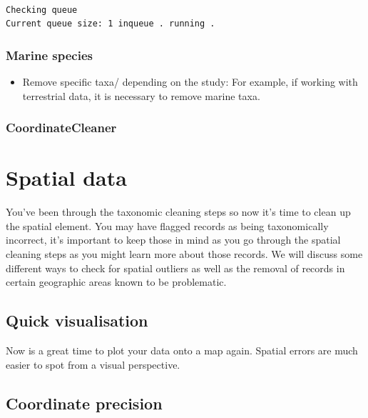 \documentclass[
  letterpaper,
  DIV=11,
  numbers=noendperiod,
  oneside]{scrreprt}
\providecommand{\tightlist}{%
  \setlength{\itemsep}{0pt}\setlength{\parskip}{0pt}}\usepackage{longtable,booktabs,array}
\begin{document}
\begin{verbatim}

Checking queue
Current queue size: 1 inqueue . running .
\end{verbatim}

\hypertarget{marine-species}{%
\subsection{Marine species}\label{marine-species}}

\begin{itemize}
\tightlist
\item
  Remove specific taxa/ depending on the study: For example, if working
  with terrestrial data, it is necessary to remove marine taxa.
\end{itemize}

\hypertarget{coordinatecleaner}{%
\subsection{CoordinateCleaner}\label{coordinatecleaner}}


\hypertarget{sec-spatial}{%
\chapter{Spatial data}\label{sec-spatial}}

You've been through the taxonomic cleaning steps so now it's time to
clean up the spatial element. You may have flagged records as being
taxonomically incorrect, it's important to keep those in mind as you go
through the spatial cleaning steps as you might learn more about those
records. We will discuss some different ways to check for spatial
outliers as well as the removal of records in certain geographic areas
known to be problematic.

\hypertarget{quick-visualisation}{%
\section{Quick visualisation}\label{quick-visualisation}}

Now is a great time to plot your data onto a map again. Spatial errors
are much easier to spot from a visual perspective.

\hypertarget{coordinate-precision}{%
\section{Coordinate precision}\label{coordinate-precision}}
\end{document}
